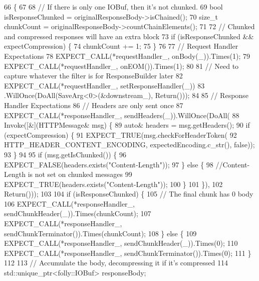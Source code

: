 \begin{DoxyCode}
66                                                                  \{
67 
68     \textcolor{comment}{// If there is only one IOBuf, then it's not chunked.}
69     \textcolor{keywordtype}{bool} isResponseChunked = originalResponseBody->isChained();
70     \textcolor{keywordtype}{size\_t} chunkCount = originalResponseBody->countChainElements();
71 
72     \textcolor{comment}{// Chunked and compressed responses will have an extra block}
73     \textcolor{keywordflow}{if} (isResponseChunked && expectCompression) \{
74       chunkCount += 1;
75     \}
76 
77     \textcolor{comment}{// Request Handler Expectations}
78     EXPECT\_CALL(*requestHandler_, onBody(\_)).Times(1);
79     EXPECT\_CALL(*requestHandler_, onEOM()).Times(1);
80 
81     \textcolor{comment}{// Need to capture whatever the filter is for ResponseBuilder later}
82     EXPECT\_CALL(*requestHandler_, setResponseHandler(\_))
83         .WillOnce(DoAll(SaveArg<0>(&downstream_), Return()));
84 
85     \textcolor{comment}{// Response Handler Expectations}
86     \textcolor{comment}{// Headers are only sent once}
87     EXPECT\_CALL(*responseHandler_, sendHeaders(\_)).WillOnce(DoAll(
88         Invoke([&](HTTPMessage& msg) \{
89           \textcolor{keyword}{auto}& headers = msg.getHeaders();
90           \textcolor{keywordflow}{if} (expectCompression) \{
91             EXPECT\_TRUE(msg.checkForHeaderToken(
92                 HTTP\_HEADER\_CONTENT\_ENCODING, expectedEncoding.c\_str(), \textcolor{keyword}{false}));
93           \}
94 
95           \textcolor{keywordflow}{if} (msg.getIsChunked()) \{
96             EXPECT\_FALSE(headers.exists(\textcolor{stringliteral}{"Content-Length"}));
97           \} \textcolor{keywordflow}{else} \{
98             \textcolor{comment}{//Content-Length is not set on chunked messages}
99             EXPECT\_TRUE(headers.exists(\textcolor{stringliteral}{"Content-Length"}));
100           \}
101         \}),
102         Return()));
103 
104     \textcolor{keywordflow}{if} (isResponseChunked) \{
105       \textcolor{comment}{// The final chunk has 0 body}
106       EXPECT\_CALL(*responseHandler_, sendChunkHeader(\_)).Times(chunkCount);
107       EXPECT\_CALL(*responseHandler_, sendChunkTerminator()).Times(chunkCount);
108     \} \textcolor{keywordflow}{else} \{
109       EXPECT\_CALL(*responseHandler_, sendChunkHeader(\_)).Times(0);
110       EXPECT\_CALL(*responseHandler_, sendChunkTerminator()).Times(0);
111     \}
112 
113     \textcolor{comment}{// Accumulate the body, decompressing it if it's compressed}
114     std::unique\_ptr<folly::IOBuf> responseBody;

\end{DoxyCode}

